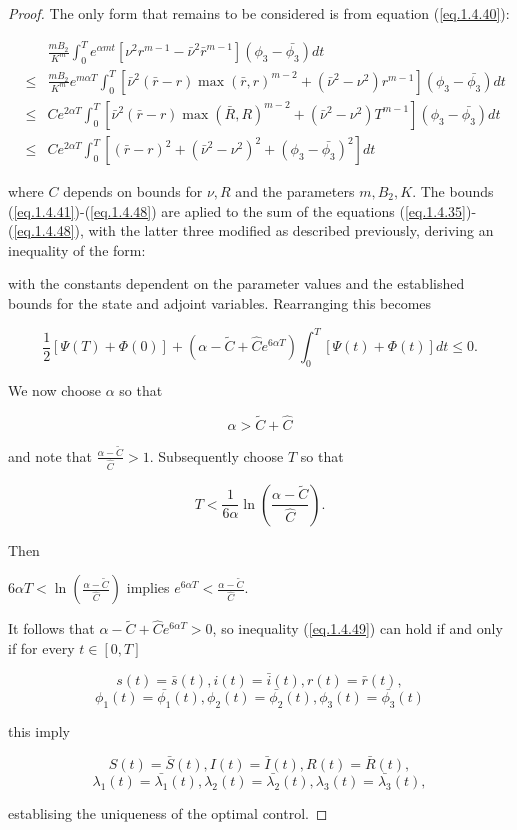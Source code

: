 \begin{proof}
The only form that remains to be considered is from equation (\ref{eq.1.4.40}):

\begin{eqnarray}
&&\frac{mB_2}{K^m}\int_{0}^{T}e^{\alpha m t}[\nu^2r^{m-1}-\bar{\nu}^2\bar{r}^{m-1}](\phi_3-\bar{\phi_3})dt\nonumber\\ &\leq& \frac{mB_2}{K^m}e^{m\alpha T}\int_{0}^{T}[\bar{\nu}^2(\bar{r}-r)\max(\bar{r},r)^{m-2}+(\bar{\nu}^2-\nu^2)r^{m-1}](\phi_3-\bar{\phi_3})dt\nonumber\\
&\leq& Ce^{2\alpha T}\int_{0}^{T}[\bar{\nu}^2(\bar{r}-r)\max(\bar{R},R)^{m-2}+(\bar{\nu}^2-\nu^2)T^{m-1}](\phi_3-\bar{\phi_3})dt\nonumber\\
&\leq& Ce^{2\alpha T}\int_{0}^{T}[(\bar{r}-r)^2+(\bar{\nu}^2-\nu^2)^2+(\phi_3-\bar{\phi_3})^2]dt \label{eq.1.4.48}
\end{eqnarray}

where $C$ depends on bounds for $\nu,R$ and the parameters $m,B_2,K$. The bounds (\ref{eq.1.4.41})-(\ref{eq.1.4.48}) are aplied to the sum of the equations (\ref{eq.1.4.35})-(\ref{eq.1.4.48}), with the latter three modified as described previously, deriving an inequality of the form:



with the constants dependent on the parameter values and the established bounds for the state and adjoint variables. Rearranging this becomes

\begin{equation}\label{eq.1.4.49}
\frac{1}{2}[\Psi(T)+\Phi(0)]+(\alpha-\tilde{C}+\hat{C}e^{6\alpha T})\int_{0}^{T}[\Psi(t)+\Phi(t)]dt\leq 0.
\end{equation}

We now choose $\alpha$ so that 

$$\alpha>\tilde{C}+\hat{C}$$

and note that $\frac{\alpha-\tilde{C}}{\hat{C}}>1$. Subsequently choose $T$ so that 

$$T<\frac{1}{6\alpha}\ln\left(\frac{\alpha-\tilde{C}}{\hat{C}}\right).$$

Then

$6\alpha T<\ln\left(\frac{\alpha-\tilde{C}}{\hat{C}}\right)$ implies $e^{6\alpha T}<\frac{\alpha-\tilde{C}}{\hat{C}}$.

It follows that $\alpha-\tilde{C}+\hat{C}e^{6\alpha T}>0$, so inequality (\ref{eq.1.4.49}) can hold if and only if for every $t\in [0,T]$

$$s(t)=\bar{s}(t),i(t)=\bar{i}(t),r(t)=\bar{r}(t),$$
$$\phi_1(t)=\bar{\phi_1}(t),\phi_2(t)=\bar{\phi_2}(t),\phi_3(t)=\bar{\phi_3}(t)$$

this imply

$$S(t)=\bar{S}(t),I(t)=\bar{I}(t),R(t)=\bar{R}(t),$$
$$\lambda_1(t)=\bar{\lambda_1}(t),\lambda_2(t)=\bar{\lambda_2}(t),\lambda_3(t)=\bar{\lambda_3}(t),$$

establising the uniqueness of the optimal control.
\end{proof}

